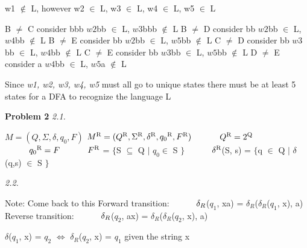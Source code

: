 \documentclass[12pt]{report}
\begin{document}
w1 $\notin$ L, however w2 $\in$ L, w3 $\in$ L, w4 $\in$ L, w5 $\in$ L \newline

B $\neq$ C consider bbb $\textit{w2}$bb $\in$ L, $\textit{w3}$bbb $\notin$ L \newline
B $\neq$ D consider bb $\textit{w2}$bb $\in$ L, $\textit{w4}$bb $\notin$ L\newline
B $\neq$ E consider bb $\textit{w2}$bb $\in$ L, $\textit{w5}$bb $\notin$ L\newline
C $\neq$ D consider bb $\textit{w3}$bb $\in$ L, $\textit{w4}$bb $\notin$ L\newline
C $\neq$ E consider bb $\textit{w3}$bb $\in$ L, $\textit{w5}$bb $\notin$ L\newline
D $\neq$ E consider a $\textit{w4}$bb $\in$ L, $\textit{w5}$a $\notin$ L\newline

Since \textit{w1, w2, w3, w4, w5} must all go to unique states there must be at least 5 states for a DFA to recognize the language L\newline
\pagebreak

\textbf{Problem 2}\newline
\textit{2.1.}

\begin{flushleft}
	$M = (Q, \Sigma, \delta, q_0, F)$ \newline
	$M\textsuperscript{R} = (Q\textsuperscript{R}, \Sigma\textsuperscript{R}, \delta\textsuperscript{R}, q_0\textsuperscript{R}, F\textsuperscript{R})$\newline
	$\hspace*{1cm} Q\textsuperscript{R} = 2\textsuperscript{Q}$\newline
	$\hspace*{1cm} q_0\textsuperscript{R} = F$\newline
	$\hspace*{1cm} F\textsuperscript{R}$ = $\big\{$S $\subseteq$ Q $\vert$ $q_0 \in$ S $\big\}$\newline
	$\hspace*{1cm} \delta\textsuperscript{R}$(S, s) = $\big\{$q $\in$ Q $\vert$ $\delta$(q,s) $\in$ S $\big\}$\newline
\end{flushleft}

\textit{2.2.}
\begin{flushleft}
	Note: Come back to this \newline
	Forward transition: \newline
	$\hspace*{1cm}\delta_R$($q_1$, xa) = $\delta_R$($\delta_R$($q_1$, x), a)\newline
	Reverse transition: \newline
	$\hspace*{1cm}\delta_R$($q_2$, ax) = $\delta_R$($\delta_R$($q_2$, x), a)\newline
	
	$\delta$($q_1$, x) = $q_2$ $\Leftrightarrow$ $\delta_R$($q_2$, x) = $q_1$ given the string x \newline
\end{flushleft}
\end{document}
